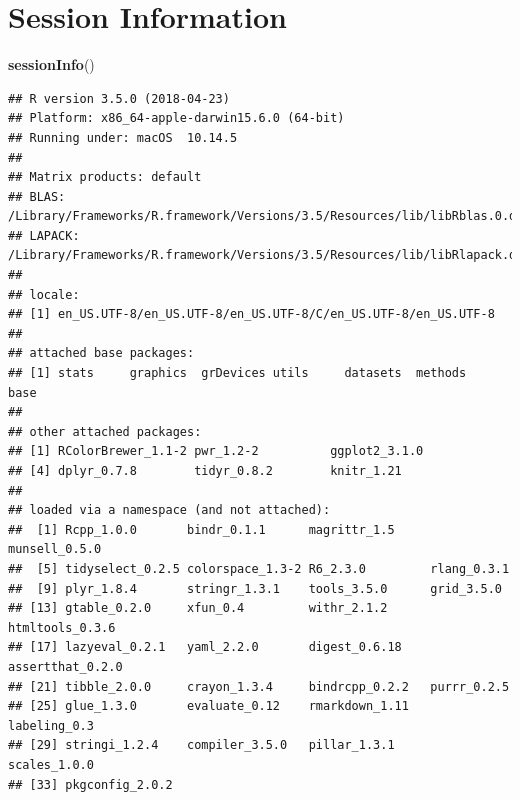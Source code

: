 \documentclass[]{article}
\newenvironment{Shaded}{\begin{snugshade}}{\end{snugshade}}
\newcommand{\KeywordTok}[1]{\textcolor[rgb]{0.13,0.29,0.53}{\textbf{#1}}}
\newcommand{\NormalTok}[1]{#1}
\begin{document}
\section{Session Information}\label{session-information}

\begin{Shaded}
\begin{Highlighting}[]
\KeywordTok{sessionInfo}\NormalTok{()}
\end{Highlighting}
\end{Shaded}

\begin{verbatim}
## R version 3.5.0 (2018-04-23)
## Platform: x86_64-apple-darwin15.6.0 (64-bit)
## Running under: macOS  10.14.5
## 
## Matrix products: default
## BLAS: /Library/Frameworks/R.framework/Versions/3.5/Resources/lib/libRblas.0.dylib
## LAPACK: /Library/Frameworks/R.framework/Versions/3.5/Resources/lib/libRlapack.dylib
## 
## locale:
## [1] en_US.UTF-8/en_US.UTF-8/en_US.UTF-8/C/en_US.UTF-8/en_US.UTF-8
## 
## attached base packages:
## [1] stats     graphics  grDevices utils     datasets  methods   base     
## 
## other attached packages:
## [1] RColorBrewer_1.1-2 pwr_1.2-2          ggplot2_3.1.0     
## [4] dplyr_0.7.8        tidyr_0.8.2        knitr_1.21        
## 
## loaded via a namespace (and not attached):
##  [1] Rcpp_1.0.0       bindr_0.1.1      magrittr_1.5     munsell_0.5.0   
##  [5] tidyselect_0.2.5 colorspace_1.3-2 R6_2.3.0         rlang_0.3.1     
##  [9] plyr_1.8.4       stringr_1.3.1    tools_3.5.0      grid_3.5.0      
## [13] gtable_0.2.0     xfun_0.4         withr_2.1.2      htmltools_0.3.6 
## [17] lazyeval_0.2.1   yaml_2.2.0       digest_0.6.18    assertthat_0.2.0
## [21] tibble_2.0.0     crayon_1.3.4     bindrcpp_0.2.2   purrr_0.2.5     
## [25] glue_1.3.0       evaluate_0.12    rmarkdown_1.11   labeling_0.3    
## [29] stringi_1.2.4    compiler_3.5.0   pillar_1.3.1     scales_1.0.0    
## [33] pkgconfig_2.0.2
\end{verbatim}
\end{document}
